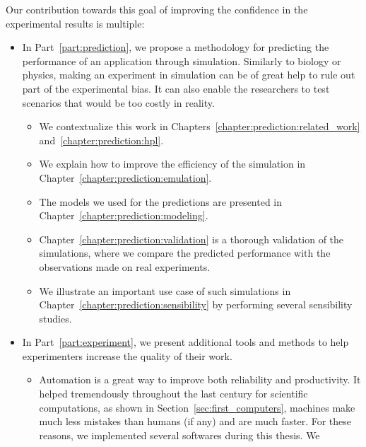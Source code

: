         Our contribution towards this goal of improving the confidence in the experimental results is multiple:
        \begin{itemize}
            \item In Part~\ref{part:prediction}, we propose a methodology for predicting the performance of an
                application through simulation. Similarly to biology or physics, making an experiment in simulation
                can be of great help to rule out part of the experimental bias. It can also enable the researchers to
                test scenarios that would be too costly in reality.
                \begin{itemize}
                    \item We contextualize this work in Chapters~\ref{chapter:prediction:related_work}
                        and~\ref{chapter:prediction:hpl}.
                    \item We explain how to improve the efficiency of the simulation in
                        Chapter~\ref{chapter:prediction:emulation}.
                    \item The models we used for the predictions are presented in
                        Chapter~\ref{chapter:prediction:modeling}.
                    \item Chapter~\ref{chapter:prediction:validation} is a thorough validation of the simulations, where
                        we compare the predicted performance with the observations made on real experiments.
                    \item We illustrate an important use case of such simulations in
                        Chapter~\ref{chapter:prediction:sensibility} by performing several sensibility studies.
                \end{itemize}
            \item In Part~\ref{part:experiment}, we present additional tools and methods to help experimenters increase
                the quality of their work.
                \begin{itemize}
                    \item Automation is a great way to improve both reliability and productivity. It helped tremendously
                        throughout the last century for scientific computations, as shown in
                        Section~\ref{sec:first_computers}, machines make much less mistakes than humans (if any) and
                        are much faster. For these reasons, we implemented several softwares during this thesis. We

\end{itemize}
\end{itemize}
